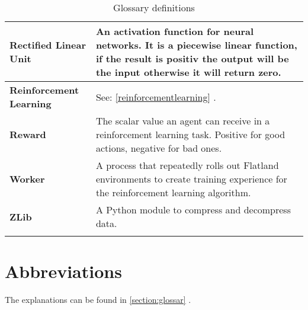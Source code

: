 \begin{longtable}{|m{3.5cm}|m{10.5cm}|}
\textbf{Rectified Linear Unit}& \label{rectifiedlinearunit}
An activation function for neural networks. It is a piecewise linear function, if the result is positiv the output will be the input otherwise it will return zero.\\
\hline

\textbf{Reinforcement Learning}&
See: \ref{reinforcementlearning} \nameref{reinforcementlearning}.\\
\hline

\textbf{Reward}&
The scalar value an agent can receive in a reinforcement learning task. Positive for good actions, negative for bad ones.\\ 
\hline

\textbf{Worker}&
A process that repeatedly rolls out Flatland environments to create training experience for the reinforcement learning algorithm.\\
\hline

\textbf{ZLib}&
A Python module to compress and decompress data. \\ \hline





\caption{Glossary definitions}
\label{tab:glossar}
\end{longtable}
\clearpage

\section{Abbreviations}\label{section:abkuerzungsverzeichnis}

The explanations can be found in \ref{section:glossar} .

